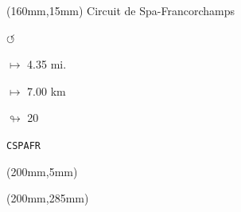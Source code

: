 \begin{textblock*}{40mm}(160mm,15mm)%
Circuit de Spa-Francorchamps
\par \Huge$\circlearrowleft$
\Large
\par$\mapsto$ 4.35 mi.
\par$\mapsto$ 7.00 km
\par$\looparrowright$ 20
\par\hfill\tiny\tt CSPAFR\\
\end{textblock*}
\begin{textblock*}{20mm}(200mm,5mm)%
\fbox{\thepage}
\end{textblock*}
\begin{textblock*}{20mm}(200mm,285mm)%
\fbox{\thepage}
\end{textblock*}
\null\newpage

